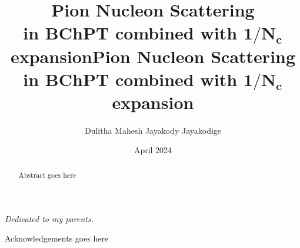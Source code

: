 \documentclass[12pt]{hamptondissertation-s}
\author{Dulitha Mahesh Jayakody Jayakodige}
\date{April 2024}
\title{Pion Nucleon Scattering \\ in BChPT combined with $\mathbf{1/N_c}$ expansion}
\begin{document}



\frontmatter

\maketitle

\cleardoublepage

\makesignature

\copyrightpage[2023]
\title{Pion Nucleon Scattering in BChPT combined with $\mathbf{1/N_c}$ expansion}

\begin{abstract}
Abstract goes here 


\end{abstract}


\begin{dedication}
\centerline{\emph{Dedicated to my parents.}}
\end{dedication}

\begin{Acknowledgements}
Acknowledgements goes here
\end{Acknowledgements}

\tableofcontents

\listoftables

\listoffigures



\mainmatter

    
   







%
%

\appendix



%
\end{document}
